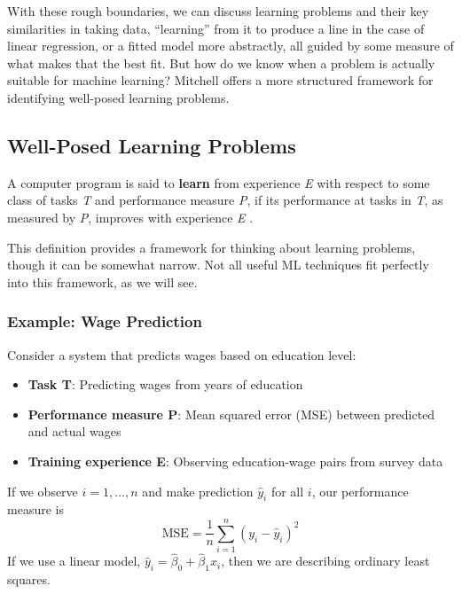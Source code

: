 With these rough boundaries, we can discuss learning problems and their key similarities in taking data, ``learning'' from it to produce a line in the case of linear regression, or a fitted model more abstractly, all guided by some measure of what makes that the best fit. But how do we know when a problem is actually suitable for machine learning? Mitchell offers a more structured framework for identifying well-posed learning problems.

\subsection{Well-Posed Learning Problems}

\begin{definitionbox}[title={Machine Learning (Mitchell 1997)}]
A computer program is said to \textbf{learn} from experience \textit{E} with respect to some class of tasks \textit{T} and performance measure \textit{P}, if its performance at tasks in \textit{T}, as measured by \textit{P}, improves with experience \textit{E} \cite{mitchell1997machine}.
\end{definitionbox}

This definition provides a framework for thinking about learning problems, though it can be somewhat narrow. Not all useful ML techniques fit perfectly into this framework, as we will see.

\subsubsection{Example: Wage Prediction}

Consider a system that predicts wages based on education level:

\begin{itemize}
\item \textbf{Task T}: Predicting wages from years of education
\item \textbf{Performance measure P}: Mean squared error (MSE) between predicted and actual wages
\item \textbf{Training experience E}: Observing education-wage pairs from survey data
\end{itemize}

If we observe $i=1,\dots,n$ and make prediction $\hat{y}_i$ for all $i$, our performance measure is
\begin{equation}
\text{MSE} = \frac{1}{n}\sum_{i=1}^{n} (y_i -\hat{y}_i)^2
\label{eq:mse-basic}
\end{equation}
If we use a linear model, $\hat{y}_i=\hat{\beta}_0 + \hat{\beta}_1x_i$, then we are describing ordinary least squares.

